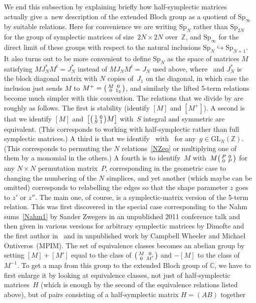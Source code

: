 \documentclass[pdftex]{sigma}
\numberwithin{equation}{section}
\def\GL{\mathrm{GL}}
\def\Sp{\mathrm{Sp}}
\def\C{\mathbb C}
\def\Z{\mathbb Z}
\def\i{^{-1}}
\def\sma#1#2#3#4{\bigl(\smallmatrix#1&#2\\#3&#4\endsmallmatrix\bigr)} %
\begin{document}
We end this subsection by explaining briefly how half-symplectic matrices actually
give a~new description of the extended Bloch group as a quotient of $\Sp_\infty$ by
suitable relations. Here for convenience we are writing $\Sp_N$ rather than
$\Sp_{2N}$ for the group of symplectic matrices of size~${2N\times2N}$ over~$\Z$,
and $\Sp_\infty$ for the direct limit of these groups with respect to the natural
inclusions $\Sp_N\hookrightarrow\Sp_{N+1}$. It also turns out to be more convenient
to define $\Sp_N$ as the space of matrices $M$ satisfying $MJ_N^*M^t=J_N^*$ instead
of $MJ_NM^t=J_N$ used above, where~\smash{$J_N=\sma0{-1_N}{1_N}0$} and $J_N^*$ is the block
diagonal matrix with $N$ copies of~$J_1$ on the diagonal, in which case the
inclusion just sends $M$ to $M^+=\sma M00{1_2}$, and similarly the lifted 5-term
relations become much simpler with this convention.
The relations that we divide by are roughly as follows. The first is stability
(identify
$[M]$ and $[M^+]$). A second is that we identify $[M]$ and~${\bigl[\sma10S1 M\bigr]}$
with~$S$ integral and symmetric are equivalent. (This corresponds to working with
half-symplectic rather than full symplectic matrices.) A third is that we identify~\smash{$M\in\Sp_N$} with~\smash{$\sma g00{{g^t}\i}M$} for any~${g\in\GL_N(\Z)}$.
(This corresponds to permuting the $N$ relations~\eqref{NZeq} or multiplying one
of them by a monomial in the others.) A fourth is to identify~$M$ with~$M\sma P00P$
for any $N\times N$ permutation matrix~$P$, corresponding in the geometric case to
changing the numbering of the $N$ simplices, and yet another (which maybe can be
omitted) corresponds to relabelling the edges so that the
shape parameter $z$ goes to $z'$ or $z''$. The main one, of course, is a
symplectic-matrix version
of the 5-term relation. This was first discovered in the special case
corresponding to the
Nahm sums~\eqref{Nahm1} by Sander Zwegers in an unpublished 2011 conference talk
and then given
in various versions for arbitrary symplectic matrices by Dimofte and the first
author in~\cite{DG}
and in unpublished work by Campbell Wheeler and Michael Ontiveros~(MPIM). The set
of equivalence classes
becomes an abelian group by setting $[M]+[M']$ equal to the class of $\sma M00{M'}$ and
$-[M]$ to the class of $M\i$. To get a map from this group to the extended Bloch group
of $\C$, we have to first enlarge it by looking at equivalence classes, not just of
half-symplectic matrices~$H$ (which is enough by the second of the equivalence relations
listed above), but of pairs consisting of a half-symplectic matrix $H=(A B)$ together
\end{document}

